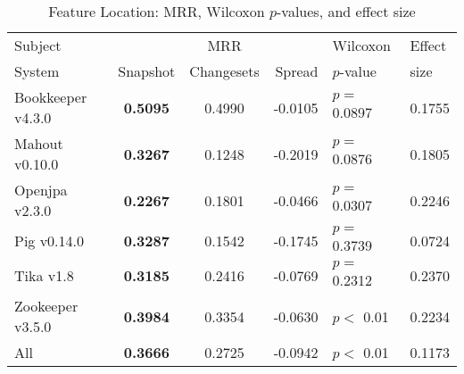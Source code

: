 \begin{table}[t]
\centering
\caption{Feature Location: MRR, Wilcoxon $p$-values, and effect size}
\begin{tabular}{l|ccr|ll}
\toprule
Subject & & MRR & & Wilcoxon & Effect \\
System  &  Snapshot & Changesets & Spread & $p$-value & size \\
\midrule
Bookkeeper v4.3.0 & {\bf 0.5095 } & 0.4990 & -0.0105 & $p = $ 0.0897 & 0.1755 \\
Mahout v0.10.0 & {\bf 0.3267 } & 0.1248 & -0.2019 & $p = $ 0.0876 & 0.1805 \\
Openjpa v2.3.0 & {\bf 0.2267 } & 0.1801 & -0.0466 & $p = $ 0.0307 & 0.2246 \\
Pig v0.14.0 & {\bf 0.3287 } & 0.1542 & -0.1745 & $p = $ 0.3739 & 0.0724 \\
Tika v1.8 & {\bf 0.3185 } & 0.2416 & -0.0769 & $p = $ 0.2312 & 0.2370 \\
Zookeeper v3.5.0 & {\bf 0.3984 } & 0.3354 & -0.0630 & $p < $ 0.01 & 0.2234 \\
\midrule
All & {\bf 0.3666 } & 0.2725 & -0.0942 & $p < $ 0.01 & 0.1173 \\
\bottomrule
\end{tabular}
\label{table:feature_location_rq1}
\end{table}

